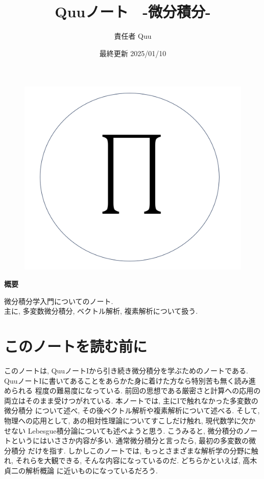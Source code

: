\documentclass[a4j,dvipdfmx]{jsarticle}
\title{Quuノート　-微分積分\ajRoman{2}-}
\date{最終更新 2025/01/10}
\author{責任者 Quu}
\numberwithin{equation}{section}
\begin{document}
    \maketitle
        \thispagestyle{empty}
    \begin{figure}[h]
        \centering
        \includegraphics[scale=0.5]{img/QuuNote/QuuNote2/icon.png}
    \end{figure}
    
    \centerline{\textbf{概要}}
    \noindent
    微分積分学入門についてのノート.\\
    主に, 多変数微分積分, ベクトル解析, 複素解析について扱う.
    \clearpage
    　
    \clearpage
    \part*{このノートを読む前に}
        このノートは, QuuノートIから引き続き微分積分を学ぶためのノートである. QuuノートIに書いてあることをあらかた身に着けた方なら特別苦も無く読み進められる
        程度の難易度になっている. 前回の思想である厳密さと計算への応用の両立はそのまま受けつがれている. 本ノートでは, 主にIで触れなかった多変数の微分積分
        について述べ, その後ベクトル解析や複素解析について述べる. そして, 物理への応用として, あの相対性理論についてすこしだけ触れ, 現代数学に欠かせない
        Lebesgue積分論についても述べようと思う. こうみると, 微分積分のノートというにはいささか内容が多い. 通常微分積分と言ったら, 最初の多変数の微分積分
        だけを指す. しかしこのノートでは, もっとさまざまな解析学の分野に触れ, それらを大観できる, そんな内容になっているのだ. どちらかといえば, 高木貞二の解析概論
        に近いものになっているだろう. \\
\end{document}
